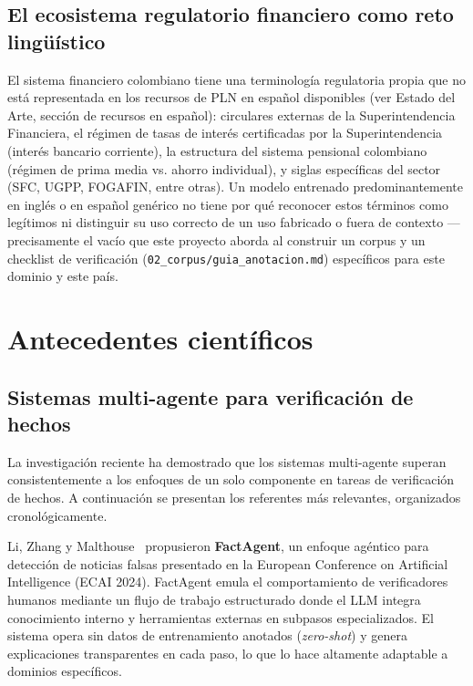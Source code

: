 \subsection{El ecosistema regulatorio financiero como reto lingüístico}

El sistema financiero colombiano tiene una terminología regulatoria propia que no está representada en los recursos de PLN en español disponibles (ver Estado del Arte, sección de recursos en español): circulares externas de la Superintendencia Financiera, el régimen de tasas de interés certificadas por la Superintendencia (interés bancario corriente), la estructura del sistema pensional colombiano (régimen de prima media vs. ahorro individual), y siglas específicas del sector (SFC, UGPP, FOGAFIN, entre otras). Un modelo entrenado predominantemente en inglés o en español genérico no tiene por qué reconocer estos términos como legítimos ni distinguir su uso correcto de un uso fabricado o fuera de contexto — precisamente el vacío que este proyecto aborda al construir un corpus y un checklist de verificación (\texttt{02\_corpus/guia\_anotacion.md}) específicos para este dominio y este país.

\section{Antecedentes científicos}

\subsection{Sistemas multi-agente para verificación de hechos}

La investigación reciente ha demostrado que los sistemas multi-agente superan consistentemente a los enfoques de un solo componente en tareas de verificación de hechos. A continuación se presentan los referentes más relevantes, organizados cronológicamente.

Li, Zhang y Malthouse~\cite{Li2024} propusieron \textbf{FactAgent}, un enfoque agéntico para detección de noticias falsas presentado en la European Conference on Artificial Intelligence (ECAI 2024). FactAgent emula el comportamiento de verificadores humanos mediante un flujo de trabajo estructurado donde el LLM integra conocimiento interno y herramientas externas en subpasos especializados. El sistema opera sin datos de entrenamiento anotados (\textit{zero-shot}) y genera explicaciones transparentes en cada paso, lo que lo hace altamente adaptable a dominios específicos.

